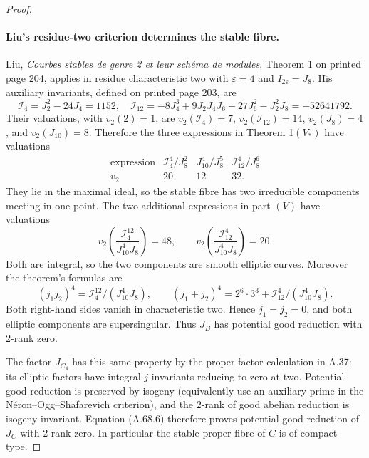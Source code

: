 \begin{proof}
\paragraph{Liu's residue-two criterion determines the stable fibre.}
Liu, \emph{Courbes stables de genre 2 et leur sch\'ema de modules},
Theorem 1 on printed page 204, applies in residue characteristic two
with \(\varepsilon=4\) and \(I_{2\varepsilon}=J_8\). His auxiliary
invariants, defined on printed page 203, are
\[
 \mathcal I_4=J_2^2-24J_4=1152,
 \quad
 \mathcal I_{12}=-8J_4^3+9J_2J_4J_6-27J_6^2-J_2^2J_8
                 =-52641792.
\]
Their valuations, with \(v_2(2)=1\), are
\(v_2(\mathcal I_4)=7\), \(v_2(\mathcal I_{12})=14\),
\(v_2(J_8)=4\), and \(v_2(J_{10})=8\). Therefore the three
expressions in Theorem 1\((V_*)\) have valuations
\[
 \begin{array}{c|ccc}
 \text{expression}&\mathcal I_4^4/J_8^2&J_{10}^4/J_8^5&
                              \mathcal I_{12}^4/J_8^6\\\hline
 v_2&20&12&32.
 \end{array}                                                   \tag{A.68.9}
\]
They lie in the maximal ideal, so the stable fibre has two
irreducible components meeting in one point. The two additional
expressions in part \((V)\) have valuations
\[
 v_2\!\left(\frac{\mathcal I_4^{12}}{J_{10}^4J_8}\right)=48,
 \qquad
 v_2\!\left(\frac{\mathcal I_{12}^{4}}{J_{10}^4J_8}\right)=20.
                                                               \tag{A.68.10}
\]
Both are integral, so the two components are smooth elliptic curves.
Moreover the theorem's formulas are
\[
 (j_1j_2)^4=
  \overline{\mathcal I_4^{12}/(J_{10}^4J_8)},\qquad
 (j_1+j_2)^4=2^6\cdot3^3+
  \overline{\mathcal I_{12}^{4}/(J_{10}^4J_8)}.
\]
Both right-hand sides vanish in characteristic two. Hence
\(j_1=j_2=0\), and both elliptic components are supersingular.
Thus \(J_B\) has potential good reduction with \(2\)-rank zero.

The factor \(J_{C_4}\) has this same property by the proper-factor
calculation in A.37: its elliptic factors have integral \(j\)-invariants
reducing to zero at two. Potential good reduction is preserved by
isogeny (equivalently use an auxiliary prime in the
N\'eron--Ogg--Shafarevich criterion), and the \(2\)-rank of good
abelian reduction is isogeny invariant. Equation (A.68.6) therefore
proves potential good reduction of \(J_C\) with \(2\)-rank zero.
In particular the stable proper fibre of \(C\) is of compact type.


\end{proof}
